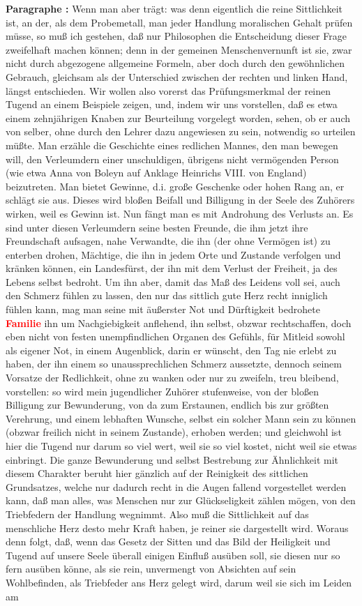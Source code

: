 \documentclass[a4paper,12pt,twoside]{book}
\newcommand{\match}[1]{\textcolor{red}{\textbf{#1}}}
\begin{document}
	\noindent\textbf{Paragraphe : }
	Wenn man aber trägt: was denn eigentlich die reine Sittlichkeit ist, an der, als dem Probemetall, man jeder Handlung moralischen Gehalt prüfen müsse, so muß ich gestehen, daß nur Philosophen die Entscheidung dieser Frage zweifelhaft machen können; denn in der gemeinen Menschenvernunft ist sie, zwar nicht durch abgezogene allgemeine Formeln, aber doch durch den gewöhnlichen Gebrauch, gleichsam als der Unterschied zwischen der rechten und linken Hand, längst entschieden. Wir wollen also vorerst das Prüfungsmerkmal der reinen Tugend an einem Beispiele zeigen, und, indem wir uns vorstellen, daß es etwa einem zehnjährigen Knaben zur Beurteilung vorgelegt worden, sehen, ob er auch von selber, ohne durch den Lehrer dazu angewiesen zu sein, notwendig so urteilen müßte. Man erzähle die Geschichte eines redlichen Mannes, den man bewegen will, den Verleumdern einer unschuldigen, übrigens nicht vermögenden Person (wie etwa Anna von Boleyn auf Anklage Heinrichs VIII. von England) beizutreten. Man bietet Gewinne, d.i. große Geschenke oder hohen Rang an, er schlägt sie aus. Dieses wird bloßen Beifall und Billigung in der Seele des Zuhörers wirken, weil es Gewinn ist. Nun fängt man es mit Androhung des Verlusts an. Es sind unter diesen Verleumdern seine besten Freunde, die ihm jetzt ihre Freundschaft aufsagen, nahe Verwandte, die ihn (der ohne Vermögen ist) zu enterben drohen, Mächtige, die ihn in jedem Orte und Zustande verfolgen und kränken können, ein Landesfürst, der ihn mit dem Verlust der Freiheit, ja des Lebens selbst bedroht. Um ihn aber, damit das Maß des Leidens voll sei, auch den Schmerz fühlen zu lassen, den nur  das sittlich gute Herz recht inniglich fühlen kann, mag man seine mit äußerster Not und Dürftigkeit bedrohete \match{Familie} ihn um Nachgiebigkeit anflehend, ihn selbst, obzwar rechtschaffen, doch eben nicht von festen unempfindlichen Organen des Gefühls, für Mitleid sowohl als eigener Not, in einem Augenblick, darin er wünscht, den Tag nie erlebt zu haben, der ihn einem so unaussprechlichen Schmerz aussetzte, dennoch seinem Vorsatze der Redlichkeit, ohne zu wanken oder nur zu zweifeln, treu bleibend, vorstellen: so wird mein jugendlicher Zuhörer stufenweise, von der bloßen Billigung zur Bewunderung, von da zum Erstaunen, endlich bis zur größten Verehrung, und einem lebhaften Wunsche, selbst ein solcher Mann sein zu können (obzwar freilich nicht in seinem Zustande), erhoben werden; und gleichwohl ist hier die Tugend nur darum so viel wert, weil sie so viel kostet, nicht weil sie etwas einbringt. Die ganze Bewunderung und selbst Bestrebung zur Ähnlichkeit mit diesem Charakter beruht hier gänzlich auf der Reinigkeit des sittlichen Grundsatzes, welche nur dadurch recht in die Augen fallend vorgestellet werden kann, daß man alles, was Menschen nur zur Glückseligkeit zählen mögen, von den Triebfedern der Handlung wegnimmt. Also muß die Sittlichkeit auf das menschliche Herz desto mehr Kraft haben, je reiner sie dargestellt wird. Woraus denn folgt, daß, wenn das Gesetz der Sitten und das Bild der Heiligkeit und Tugend auf unsere Seele überall einigen Einfluß ausüben soll, sie diesen nur so fern ausüben könne, als sie rein, unvermengt von Absichten auf sein Wohlbefinden, als Triebfeder ans Herz gelegt wird, darum weil sie sich im Leiden am 
\end{document}
